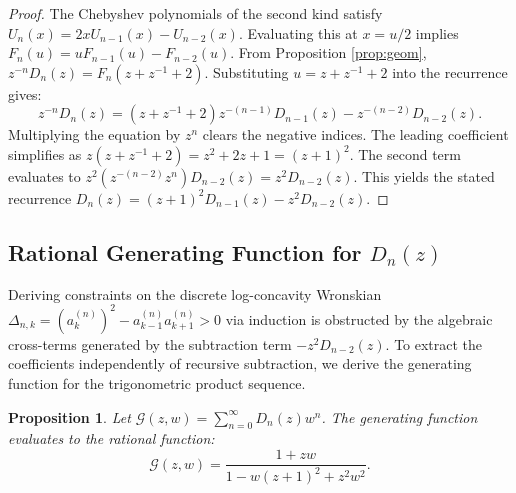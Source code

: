 \documentclass[11pt]{article}
\newtheorem{proposition}[theorem]{Proposition}
\begin{document}
\begin{proof}
The Chebyshev polynomials of the second kind satisfy $U_n(x) = 2x U_{n-1}(x) - U_{n-2}(x)$. Evaluating this at $x = u/2$ implies $F_n(u) = u F_{n-1}(u) - F_{n-2}(u)$. From Proposition \ref{prop:geom}, $z^{-n}D_n(z) = F_n(z+z^{-1}+2)$. Substituting $u = z+z^{-1}+2$ into the recurrence gives:
\begin{equation*}
z^{-n}D_n(z) = (z+z^{-1}+2) z^{-(n-1)}D_{n-1}(z) - z^{-(n-2)}D_{n-2}(z).
\end{equation*}
Multiplying the equation by $z^n$ clears the negative indices. The leading coefficient simplifies as $z(z+z^{-1}+2) = z^2+2z+1 = (z+1)^2$. The second term evaluates to $z^2(z^{-(n-2)}z^n)D_{n-2}(z) = z^2 D_{n-2}(z)$. This yields the stated recurrence $D_n(z) = (z+1)^2 D_{n-1}(z) - z^2 D_{n-2}(z)$.
\end{proof}

\subsection{Rational Generating Function for \texorpdfstring{$D_n(z)$}{Dn(z)}}

Deriving constraints on the discrete log-concavity Wronskian $\Delta_{n,k} = (a_k^{(n)})^2 - a_{k-1}^{(n)}a_{k+1}^{(n)} > 0$ via induction is obstructed by the algebraic cross-terms generated by the subtraction term $-z^2 D_{n-2}(z)$. To extract the coefficients independently of recursive subtraction, we derive the generating function for the trigonometric product sequence.

\begin{proposition}\label{prop:gen_func2}
Let $\mathcal{G}(z,w) = \sum_{n=0}^\infty D_n(z) w^n$. The generating function evaluates to the rational function:
\begin{equation}
\mathcal{G}(z,w) = \frac{1+zw}{1 - w(z+1)^2 + z^2w^2}.
\end{equation}
\end{proposition}
\end{document}
